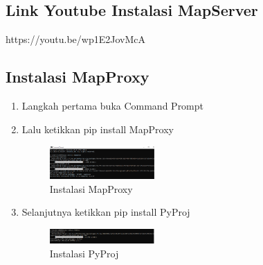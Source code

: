 \subsection{Link Youtube Instalasi MapServer}
{https://youtu.be/wp1E2JovMcA}

\subsection{Instalasi MapProxy}
\begin{enumerate}
  \item Langkah pertama buka Command Prompt
  \item Lalu ketikkan pip install MapProxy
  \hfill\break
  \begin{figure}[H]
  \includegraphics[width=4cm]{figures/tugas4/1174070/13.png}
  \centering
  \caption{Instalasi MapProxy}
  \end{figure}
  
  \item Selanjutnya ketikkan pip install PyProj
  \hfill\break
  \begin{figure}[H]
  \includegraphics[width=4cm]{figures/tugas4/1174070/14.png}
  \centering
  \caption{Instalasi PyProj}
  \end{figure}
\end{enumerate}

